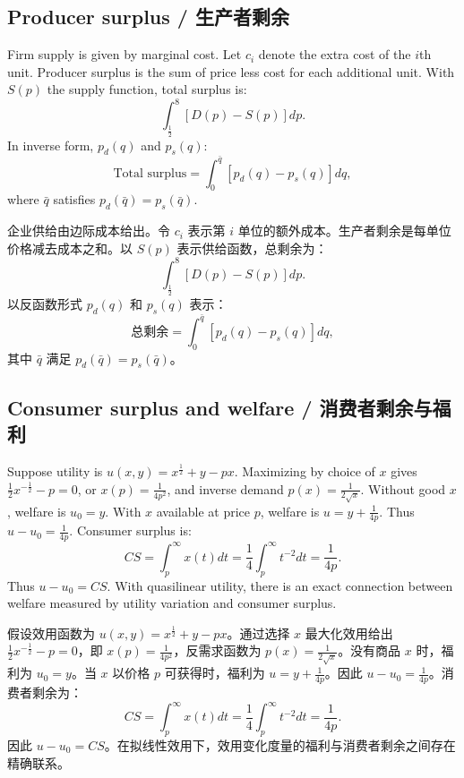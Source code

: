 \subsection{Producer surplus / 生产者剩余}

\begin{original}
Firm supply is given by marginal cost. Let $c_i$ denote the extra cost of the $i$th unit. Producer surplus is the sum of price less cost for each additional unit. With $S(p)$ the supply function, total surplus is:
\[
\int_{\frac{1}{2}}^8 [D(p) - S(p)]dp.
\]
In inverse form, $p_d(q)$ and $p_s(q)$:
\[
\text{Total surplus} = \int_0^{\bar{q}} [p_d(q) - p_s(q)]dq,
\]
where $\bar{q}$ satisfies $p_d(\bar{q}) = p_s(\bar{q})$.
\end{original}
\begin{translation}
企业供给由边际成本给出。令 $c_i$ 表示第 $i$ 单位的额外成本。生产者剩余是每单位价格减去成本之和。以 $S(p)$ 表示供给函数，总剩余为：
\[
\int_{\frac{1}{2}}^8 [D(p) - S(p)]dp.
\]
以反函数形式 $p_d(q)$ 和 $p_s(q)$ 表示：
\[
\text{总剩余} = \int_0^{\bar{q}} [p_d(q) - p_s(q)]dq,
\]
其中 $\bar{q}$ 满足 $p_d(\bar{q}) = p_s(\bar{q})$。
\end{translation}

\subsection{Consumer surplus and welfare / 消费者剩余与福利}

\begin{original}
Suppose utility is $u(x, y) = x^{\frac{1}{2}} + y - px$. Maximizing by choice of $x$ gives $\frac{1}{2}x^{-\frac{1}{2}} - p = 0$, or $x(p) = \frac{1}{4p^2}$, and inverse demand $p(x) = \frac{1}{2\sqrt{x}}$. Without good $x$, welfare is $u_0 = y$. With $x$ available at price $p$, welfare is $u = y + \frac{1}{4p}$. Thus $u - u_0 = \frac{1}{4p}$. Consumer surplus is:
\[
CS = \int_p^{\infty} x(t)dt = \frac{1}{4}\int_p^{\infty} t^{-2}dt = \frac{1}{4p}.
\]
Thus $u - u_0 = CS$. With quasilinear utility, there is an exact connection between welfare measured by utility variation and consumer surplus.
\end{original}
\begin{translation}
假设效用函数为 $u(x, y) = x^{\frac{1}{2}} + y - px$。通过选择 $x$ 最大化效用给出 $\frac{1}{2}x^{-\frac{1}{2}} - p = 0$，即 $x(p) = \frac{1}{4p^2}$，反需求函数为 $p(x) = \frac{1}{2\sqrt{x}}$。没有商品 $x$ 时，福利为 $u_0 = y$。当 $x$ 以价格 $p$ 可获得时，福利为 $u = y + \frac{1}{4p}$。因此 $u - u_0 = \frac{1}{4p}$。消费者剩余为：
\[
CS = \int_p^{\infty} x(t)dt = \frac{1}{4}\int_p^{\infty} t^{-2}dt = \frac{1}{4p}.
\]
因此 $u - u_0 = CS$。在拟线性效用下，效用变化度量的福利与消费者剩余之间存在精确联系。
\end{translation}

